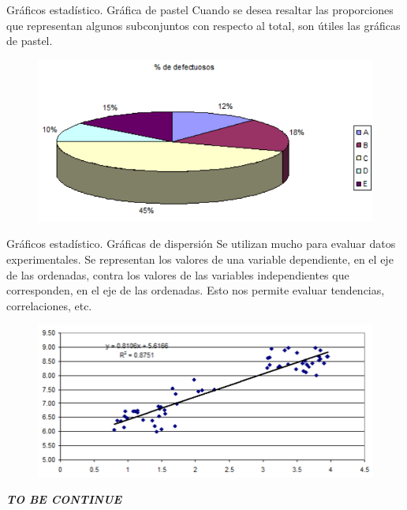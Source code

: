 \documentclass[11pt]{beamer}
\begin{document}
      \begin{frame}{Gráficos estadístico. Gráfica de pastel}
        Cuando se desea resaltar las proporciones que representan algunos subconjuntos con respecto al total, son útiles las gráficas de pastel.
        \begin{figure}
            \centering
            \includegraphics[width=0.7\linewidth]{images/graficos_pastel}
            \label{fig:graficospastel}
        \end{figure}
      \end{frame}

      \begin{frame}{Gráficos estadístico. Gráficas de dispersión}
        Se utilizan mucho para evaluar datos experimentales. Se representan los valores de una variable dependiente, en el eje de las ordenadas, contra los valores de las variables independientes que corresponden, en el eje de las ordenadas. Esto nos permite evaluar tendencias, correlaciones, etc.
        \begin{figure}
            \centering
            \includegraphics[width=0.7\linewidth]{images/graficos_dispersion}
            \label{fig:graficosdispersion}
        \end{figure}
      \end{frame}


    \begin{frame}
      \centering
      \textit{\textbf{ \huge  TO BE CONTINUE}}
    \end{frame}
\end{document}
